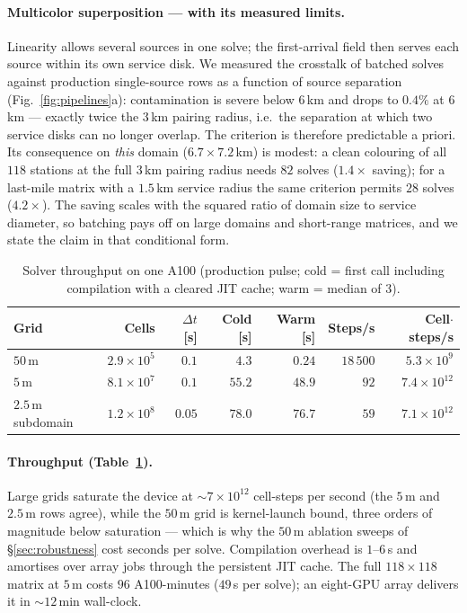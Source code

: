 \paragraph{Multicolor superposition --- with its measured limits.}
Linearity allows several sources in one solve; the first-arrival
field then serves each source within its own service disk. We
measured the crosstalk of batched solves against production
single-source rows as a function of source separation
(Fig.~\ref{fig:pipelines}a): contamination is severe below
$6\,$km and drops to $0.4\%$ at $6\,$km --- exactly twice the
$3\,$km pairing radius, i.e.\ the separation at which two service
disks can no longer overlap. The criterion is therefore predictable
a priori. Its consequence on \emph{this} domain
($6.7\times7.2\,$km) is modest: a clean colouring of all $118$
stations at the full $3\,$km pairing radius needs $82$ solves
($1.4\times$ saving); for a last-mile matrix with a $1.5\,$km
service radius the same criterion permits $28$ solves
($4.2\times$). The saving scales with the squared ratio of domain
size to service diameter, so batching pays off on large domains and
short-range matrices, and we state the claim in that conditional
form.

\begin{table}[t]
\centering
\caption{Solver throughput on one A100 (production pulse; cold = first
call including compilation with a cleared JIT cache; warm = median of
3).}
\label{tab:throughput}
\begin{tabular}{lrrrrrr}
\toprule
Grid & Cells & $\Delta t$ [s] & Cold [s] & Warm [s] & Steps/s & Cell$\cdot$steps/s \\
\midrule
$50\,$m & $2.9\times10^5$ & $0.1$ & $4.3$ & $0.24$ & $18\,500$ & $5.3\times10^{9}$ \\
$5\,$m & $8.1\times10^7$ & $0.1$ & $55.2$ & $48.9$ & $92$ & $7.4\times10^{12}$ \\
$2.5\,$m subdomain & $1.2\times10^8$ & $0.05$ & $78.0$ & $76.7$ & $59$ & $7.1\times10^{12}$ \\
\bottomrule
\end{tabular}
\end{table}

\paragraph{Throughput (Table~\ref{tab:throughput}).}
Large grids saturate the device at ${\sim}7\times10^{12}$
cell-steps per second (the $5\,$m and $2.5\,$m rows agree), while
the $50\,$m grid is kernel-launch bound, three orders of magnitude
below saturation --- which is why the $50\,$m ablation sweeps of
\S\ref{sec:robustness} cost seconds per solve. Compilation overhead
is $1$--$6\,$s and amortises over array jobs through the persistent
JIT cache. The full $118\times118$ matrix at $5\,$m costs
$96$ A100-minutes ($49\,$s per solve); an eight-GPU array delivers
it in ${\sim}12\,$min wall-clock.

